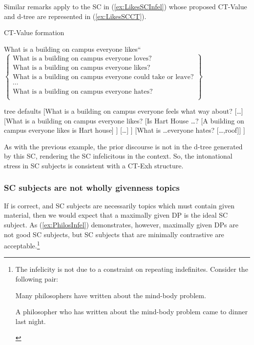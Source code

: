 \documentclass[
	letterpaper,
]{article}
\begin{document}
Similar remarks apply to the SC in (\ref{ex:LikesSCInfel}) whose proposed CT-Value and d-tree are represented in (\ref{ex:LikesSCCT}).
\begin{exe}
	\ex\label{ex:LikesSCCT}
	\begin{xlist}
		\ex CT-Value formation
		\begin{xlist}
			 What is a building on campus everyone likes``
			 $
			\begin{Bmatrix}
				\text{What is a building on campus everyone loves?}\\
				\text{What is a building on campus everyone likes?}\\
				\text{What is a building on campus everyone could take or leave?}\\
				\cdots\\
				\text{What is a building on campus everyone hates?}\\
			\end{Bmatrix}
			$			
		\end{xlist}
		\ex
		\begin{forest}
			tree defaults
			[What is a building on campus everyone feels what way about?
				[\ldots]
				[What is a building on campus everyone likes?
					[Is Hart House \ldots?
						[A building on campus everyone likes is Hart house]
					]
					[\ldots]
				]
				[What is \ldots everyone hates?
				[\ldots,roof]]
			]
		\end{forest}	
	\end{xlist}
\end{exe}
As with the previous example, the prior discourse is not in the d-tree generated by this SC, rendering the SC infelicitous in the context.
So, the intonational stress in SC subjects is consistent with a CT-Exh structure.
\subsubsection{SC subjects are not wholly givenness topics}
If \textcite{mikkelsen2005copular} is correct, and SC subjects are necessarily topics which must contain given material, then we would expect that a maximally given DP is the ideal SC subject.
As (\ref{ex:PhilosInfel}) demonstrates, however, maximally given DPs are not good SC subjects, but SC subjects that are minimally contrastive are acceptable.\footnote{
  The infelicity is not due to a constraint on repeating indefinites.
  Consider the following pair:
  \begin{xlisti}
	  \ex Many philosophers have written about the mind-body problem.
	  \begin{xlista}
		  \ex A philosopher who has written about the mind-body problem came to dinner last night.
	  \end{xlista}	  
  \end{xlisti}
}
\end{document}

